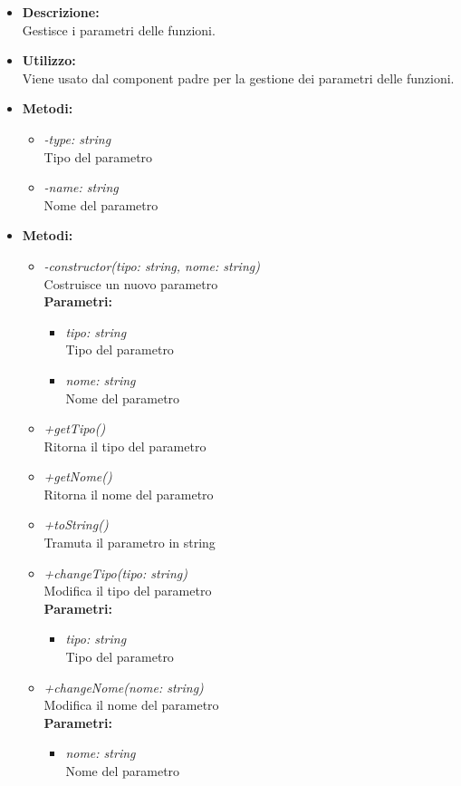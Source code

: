 \begin{itemize}
	\item \textbf{Descrizione:}\\
	Gestisce i parametri delle funzioni.
	\item \textbf{Utilizzo:}\\
	Viene usato dal component padre per la gestione dei parametri delle funzioni.
	\item \textbf{Metodi:}
		\begin{itemize}
			\item \emph{-type: string}\\
    		Tipo del parametro
    		\item \emph{-name: string}\\
    		Nome del parametro
		\end{itemize}
	\item \textbf{Metodi:}
		\begin{itemize}
			\item \emph{-constructor(tipo: string, nome: string)}\\
    		Costruisce un nuovo parametro\\
    		\textbf{Parametri:}
    		\begin{itemize}
    			\item \emph{tipo: string}\\
    			Tipo del parametro
    			\item \emph{nome: string}\\
    			Nome del parametro
    		\end{itemize}
    		\item \emph{+getTipo()}\\
    		Ritorna il tipo del parametro
    		\item \emph{+getNome()}\\
    		Ritorna il nome del parametro
    		\item \emph{+toString()}\\
    		Tramuta il parametro in string
    		\item \emph{+changeTipo(tipo: string)}\\
    		Modifica il tipo del parametro\\
    		\textbf{Parametri:}
    		\begin{itemize}
    			\item \emph{tipo: string}\\
    			Tipo del parametro
    		\end{itemize}
    		\item \emph{+changeNome(nome: string)}\\
    		Modifica il nome del parametro\\
    		\textbf{Parametri:}
    		\begin{itemize}
    			\item \emph{nome: string}\\
    			Nome del parametro
    		\end{itemize}
    	\end{itemize}
\end{itemize}